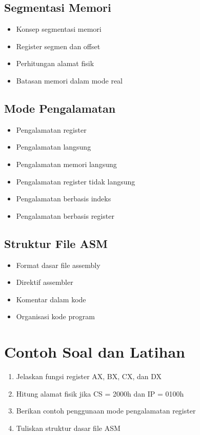 \subsection{Segmentasi Memori}
\begin{itemize}
\item Konsep segmentasi memori
\item Register segmen dan offset
\item Perhitungan alamat fisik
\item Batasan memori dalam mode real
\end{itemize}

\subsection{Mode Pengalamatan}
\begin{itemize}
\item Pengalamatan register
\item Pengalamatan langsung
\item Pengalamatan memori langsung
\item Pengalamatan register tidak langsung
\item Pengalamatan berbasis indeks
\item Pengalamatan berbasis register
\end{itemize}

\subsection{Struktur File ASM}
\begin{itemize}
\item Format dasar file assembly
\item Direktif assembler
\item Komentar dalam kode
\item Organisasi kode program
\end{itemize}

\section{Contoh Soal dan Latihan}
\begin{enumerate}
\item Jelaskan fungsi register AX, BX, CX, dan DX
\item Hitung alamat fisik jika CS = 2000h dan IP = 0100h
\item Berikan contoh penggunaan mode pengalamatan register
\item Tuliskan struktur dasar file ASM
\end{enumerate}


